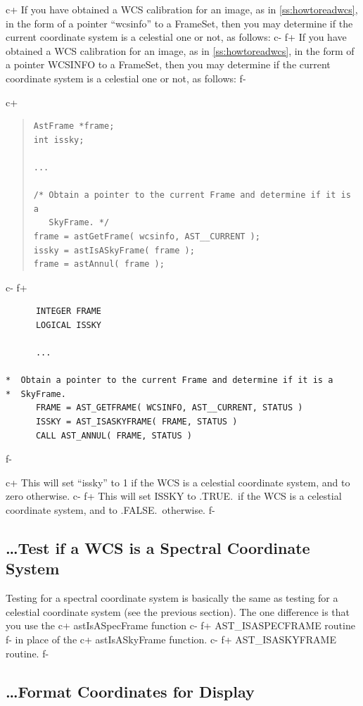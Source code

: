 \documentclass[twoside,11pt]{article}
\newcommand{\secref}[1]{\S\ref{#1}}
\renewcommand{\secref}[1]{\ref{#1}}
\begin{document}
c+
If you have obtained a WCS calibration for an image, as in
\secref{ss:howtoreadwcs}, in the form of a pointer ``wcsinfo'' to a
FrameSet, then you may determine if the current coordinate system is a
celestial one or not, as follows:
c-
f+
If you have obtained a WCS calibration for an image, as in
\secref{ss:howtoreadwcs}, in the form of a pointer WCSINFO to a
FrameSet, then you may determine if the current coordinate system is a
celestial one or not, as follows:
f-

c+
\begin{quote}
\small
\begin{verbatim}
AstFrame *frame;
int issky;

...

/* Obtain a pointer to the current Frame and determine if it is a
   SkyFrame. */
frame = astGetFrame( wcsinfo, AST__CURRENT );
issky = astIsASkyFrame( frame );
frame = astAnnul( frame );
\end{verbatim}
\normalsize
\end{quote}
c-
f+
\small
\begin{verbatim}
      INTEGER FRAME
      LOGICAL ISSKY

      ...

*  Obtain a pointer to the current Frame and determine if it is a
*  SkyFrame.
      FRAME = AST_GETFRAME( WCSINFO, AST__CURRENT, STATUS )
      ISSKY = AST_ISASKYFRAME( FRAME, STATUS )
      CALL AST_ANNUL( FRAME, STATUS )
\end{verbatim}
\normalsize
f-

c+
This will set ``issky'' to 1 if the WCS is a celestial coordinate
system, and to zero otherwise.
c-
f+
This will set ISSKY to .TRUE.\ if the WCS is a celestial coordinate
system, and to .FALSE.\ otherwise.
f-

\subsection{\label{ss:howtotestforspectral}\ldots Test if a WCS is a Spectral Coordinate System}
Testing for a spectral coordinate system is basically the same as testing
for a celestial coordinate system (see the previous section). The one
difference is that you use the 
c+
astIsASpecFrame function
c-
f+
AST\_ISASPECFRAME routine
f-
in place of the 
c+
astIsASkyFrame function.
c-
f+
AST\_ISASKYFRAME routine.
f-

\subsection{\label{ss:howtoformatcoordinates}\ldots Format Coordinates for Display}
\end{document}
